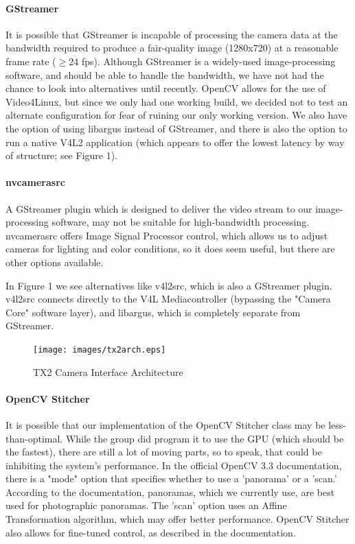 \documentclass[letterpaper,10pt,serif,draftclsnofoot,onecolumn,compsoc,titlepage]{IEEEtran}
\begin{document}
\paragraph*{GStreamer} It is possible that GStreamer is incapable of processing the camera 
data at the bandwidth required to produce a fair-quality image (1280x720) at a reasonable frame 
rate ($\ge$24 fps). Although GStreamer is a widely-used image-processing software, and should be 
able to handle the bandwidth, we have not had the chance to look into alternatives until recently. 
OpenCV allows for the use of Video4Linux, but since we only had one working build, we decided not 
to test an alternate configuration for fear of ruining our only working version. We also have the 
option of using libargus instead of GStreamer, and there is also the option to run a native V4L2 
application (which appears to offer the lowest latency by way of structure; see Figure 1).

\paragraph*{nvcamerasrc} A GStreamer plugin which is designed to deliver the video stream to our 
image-processing software, may not be suitable for high-bandwidth processing. nvcamerasrc offers 
Image Signal Processor control, which allows us to adjust cameras for lighting and color conditions, 
so it does seem useful, but there are other options available. 

In Figure 1 we see alternatives 
like v4l2src, which is also a GStreamer plugin. v4l2src connects directly to the V4L Mediacontroller 
(bypassing the "Camera Core" software layer), and libargus, which is completely separate from GStreamer.

\begin{figure}[H]
  	\centering
	\label{fig:tx2arch}
	\texttt{[image: images/tx2arch.eps]}
	\caption{TX2 Camera Interface Architecture \label{overflow}}
\end{figure}

\paragraph*{OpenCV Stitcher} It is possible that our implementation of the OpenCV Stitcher class may 
be less-than-optimal. While the group did program it to use the GPU (which should be the fastest), 
there are still a lot of moving parts, so to speak, that could be inhibiting the system's performance. 
In the official OpenCV 3.3 documentation, there is a "mode" option that specifies 
whether to use a 'panorama' or a 'scan.' According to the documentation, panoramas, which we currently 
use, are best used for photographic panoramas. The 'scan' option uses an Affine Transformation 
algorithm, which may offer better performance. OpenCV Stitcher also allows for fine-tuned control, 
as described in the documentation.
\end{document}
